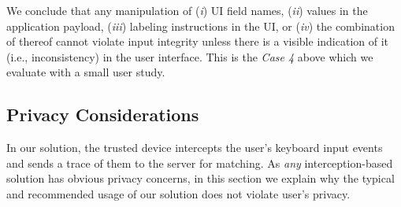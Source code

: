 We conclude that any manipulation of (\emph{i}) UI field names, (\emph{ii}) values in the application payload, (\emph{iii}) labeling instructions in the UI, or (\emph{iv}) the combination of thereof cannot violate input integrity unless there is a visible indication of it (i.e., inconsistency) in the user interface. This is the \emph{Case 4} above which we evaluate with a small user study.




\subsection{Privacy Considerations} 
\label{sec:privacy}

In our solution, the trusted \device device intercepts the user's keyboard input events and sends a trace of them to the server for matching. As \emph{any} interception-based solution has obvious privacy concerns, in this section we explain why the typical and recommended usage of our solution does not violate user's privacy.


